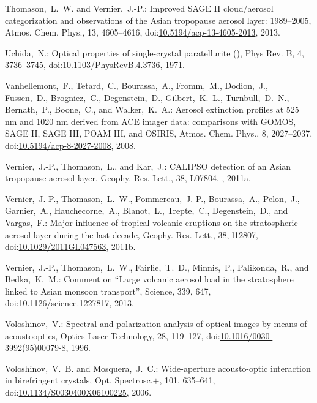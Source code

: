 \documentclass[amtd, online, hvmath]{copernicus}
\begin{document}
\begin{thebibliography}{99}
Thomason,~L.~W. and Vernier,~J.-P.: Improved SAGE II cloud/aerosol
categorization and observations of the Asian tropopause aerosol layer:
1989--2005, Atmos. Chem. Phys., 13, 4605--4616,
doi:\href{http://dx.doi.org/10.5194/acp-13-4605-2013}{10.5194/acp-13-4605-2013},
2013.


Uchida,~N.: Optical properties of single-crystal paratellurite
(), Phys Rev. B, 4, 3736--3745,
doi:\href{http://dx.doi.org/10.1103/PhysRevB.4.3736}{10.1103/PhysRevB.4.3736},
1971.


Vanhellemont,~F., Tetard,~C., Bourassa,~A., Fromm,~M., Dodion,~J.,
Fussen,~D., Brogniez,~C., Degenstein,~D., Gilbert,~K.~L., Turnbull,~D.~N.,
Bernath,~P., Boone,~C., and Walker,~K.~A.: Aerosol extinction profiles at 525
nm and 1020 nm derived from ACE imager data: comparisons with GOMOS, SAGE II,
SAGE III, POAM III, and OSIRIS, Atmos. Chem. Phys., 8, 2027--2037,
doi:\href{http://dx.doi.org/10.5194/acp-8-2027-2008}{10.5194/acp-8-2027-2008},
2008.


Vernier,~J.-P., Thomason,~L., and Kar,~J.: CALIPSO detection of an Asian
tropopause aerosol layer, Geophy. Res. Lett., 38, L07804,
, 2011a.


Vernier,~J.-P., Thomason,~L.~W., Pommereau,~J.-P., Bourassa,~A., Pelon,~J.,
Garnier,~A., Hauchecorne,~A., Blanot,~L., Trepte,~C., Degenstein,~D., and
Vargas,~F.: Major influence of tropical volcanic eruptions on the
stratospheric aerosol layer during the last decade, Geophy. Res. Lett., 38,
l12807,
doi:\href{http://dx.doi.org/10.1029/2011GL047563}{10.1029/2011GL047563},
2011b.


Vernier,~J.-P., Thomason,~L.~W., Fairlie,~T.~D., Minnis,~P., Palikonda,~R.,
and Bedka,~K.~M.: Comment on ``Large volcanic aerosol load in the
stratosphere linked to Asian monsoon transport'', Science, 339, 647,
doi:\href{http://dx.doi.org/10.1126/science.1227817}{10.1126/science.1227817},
2013.


Voloshinov,~V.: Spectral and polarization analysis of optical images by means
of acoustooptics, Optics Laser Technology, 28, 119--127,
doi:\href{http://dx.doi.org/10.1016/0030-3992(95)00079-8}{10.1016/0030-3992(95)00079-8},
1996.


Voloshinov,~V.~B. and Mosquera,~J.~C.: Wide-aperture acousto-optic
interaction in birefringent crystals, Opt. Spectrosc.$+$, 101, 635--641,
doi:\href{http://dx.doi.org/10.1134/S0030400X06100225}{10.1134/S0030400X06100225},
2006.



\end{thebibliography}
\end{document}
